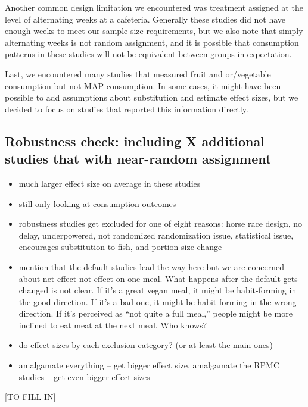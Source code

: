 \documentclass[sn-nature,pdflatex]{sn-jnl}
\providecommand{\tightlist}{%
  \setlength{\itemsep}{0pt}\setlength{\parskip}{0pt}}
\begin{document}
Another common design limitation we encountered was treatment assigned
at the level of alternating weeks at a cafeteria. Generally these
studies did not have enough weeks to meet our sample size requirements,
but we also note that simply alternating weeks is not random assignment,
and it is possible that consumption patterns in these studies will not
be equivalent between groups in expectation.

Last, we encountered many studies that measured fruit and or/vegetable
consumption but not MAP consumption. In some cases, it might have been
possible to add assumptions about substitution and estimate effect
sizes, but we decided to focus on studies that reported this information
directly.

\subsection{Robustness check: including X additional studies that with
near-random
assignment}\label{robustness-check-including-x-additional-studies-that-with-near-random-assignment}

\begin{itemize}
\tightlist
\item
  much larger effect size on average in these studies
\item
  still only looking at consumption outcomes
\item
  robustness studies get excluded for one of eight reasons: horse race
  design, no delay, underpowered, not randomized randomization issue,
  statistical issue, encourages substitution to fish, and portion size
  change
\item
  mention that the default studies lead the way here but we are
  concerned about net effect not effect on one meal. What happens after
  the default gets changed is not clear. If it's a great vegan meal, it
  might be habit-forming in the good direction. If it's a bad one, it
  might be habit-forming in the wrong direction. If it's perceived as
  ``not quite a full meal,'' people might be more inclined to eat meat
  at the next meal. Who knows?
\item
  do effect sizes by each exclusion category? (or at least the main
  ones)
\item
  amalgamate everything -- get bigger effect size. amalgamate the RPMC
  studies -- get even bigger effect sizes
\end{itemize}

{[}TO FILL IN{]}
\end{document}
